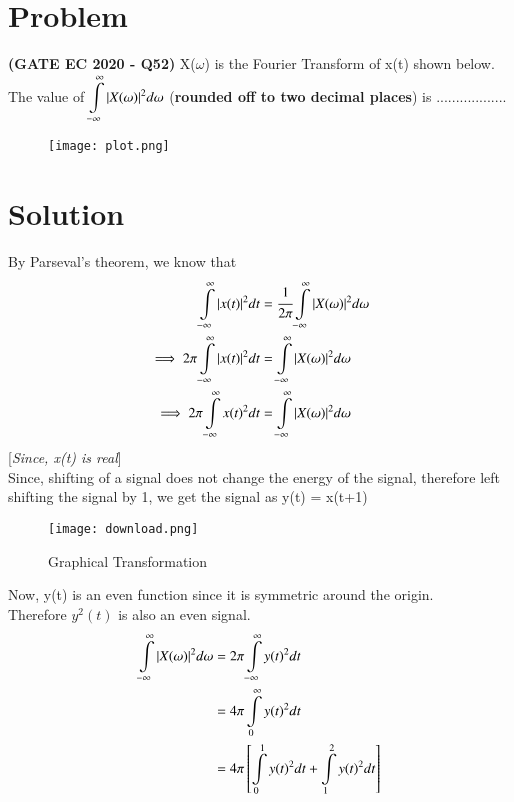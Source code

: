 \documentclass[journal,12pt,twocolumn]{IEEEtran}
\begin{document}
\section*{\textbf{Problem}}
\textbf{(GATE EC 2020 - Q52)} X($\omega$) is the Fourier Transform of x(t) shown below. The value of $\displaystyle\int\limits_{-\infty}^{\infty} \vert X(\omega)\vert^2 d\omega$ (\textbf{rounded off to two decimal places}) is $..................$
\begin{figure}[!ht]
\centering
\texttt{[image: plot.png]}
\end{figure}

\section*{\textbf{Solution}}
By Parseval's theorem, we know that
\begin{align}
\displaystyle\int\limits_{-\infty}^{\infty} \vert x(t)\vert^2 dt &= \cfrac{1}{2\pi}\displaystyle\int\limits_{-\infty}^{\infty} \vert X(\omega)\vert^2 d\omega\\
\implies 2\pi \displaystyle\int\limits_{-\infty}^{\infty} \vert x(t)\vert^2 dt &= \displaystyle\int\limits_{-\infty}^{\infty} \vert X(\omega)\vert^2 d\omega\\
\implies 2\pi \displaystyle\int\limits_{-\infty}^{\infty} {x(t)}^2 dt &= \displaystyle\int\limits_{-\infty}^{\infty} \vert X(\omega)\vert^2 d\omega
\end{align}
[\textit{Since, x(t) is real}]\\

Since, shifting of a signal does not change the energy of the signal, therefore left shifting the signal by 1, we get the signal as y(t) = x(t+1)

\begin{figure}[!ht]
\centering
\texttt{[image: download.png]}
\caption{Graphical Transformation}
\end{figure}

Now, y(t) is an even function since it is symmetric around the origin.\\
Therefore $y^2(t)$ is also an even signal.\\

\begin{align}
  \displaystyle\int\limits_{-\infty}^{\infty} \vert X(\omega)\vert^2 d\omega &= 2\pi \displaystyle\int\limits_{-\infty}^{\infty} {y(t)}^2 dt\\
  &= 4\pi \displaystyle\int\limits_{0}^{\infty} {y(t)}^2 dt\\
  &= 4\pi \left[ \displaystyle\int\limits_{0}^{1} {y(t)}^2 dt +  \displaystyle\int\limits_{1}^{2} {y(t)}^2 dt\right]
\end{align}
\end{document}
